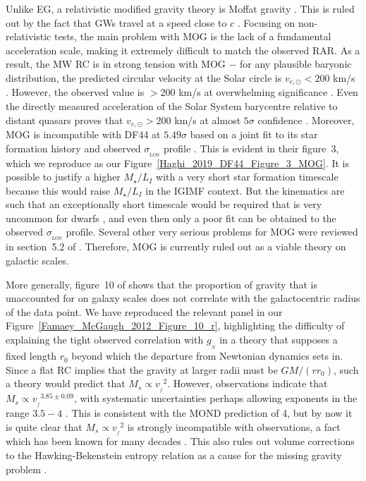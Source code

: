 \documentclass[fleqn,usenatbib,useAMS]{mnras} %
\begin{document}
Unlike EG, a relativistic modified gravity theory is Moffat gravity \citep[MOG;][]{Moffat_2006}. This is ruled out by the fact that GWs travel at a speed close to $c$ \citep{Boran_2018}. Focusing on non-relativistic tests, the main problem with MOG is the lack of a fundamental acceleration scale, making it extremely difficult to match the observed RAR. As a result, the MW RC is in strong tension with MOG $-$ for any plausible baryonic distribution, the predicted circular velocity at the Solar circle is $v_{c, \odot} < 200$ km/s \citep{Negrelli_2018}. However, the observed value is $> 200$ km/s at overwhelming significance \citep[e.g.][]{McMillan_2017, McGaugh_2018}. Even the directly measured acceleration of the Solar System barycentre relative to distant quasars proves that $v_{c, \odot} > 200$ km/s at almost $5\sigma$ confidence \citep{Bovy_2020, Klioner_2021}. Moreover, MOG is incompatible with DF44 at $5.49 \sigma$ based on a joint fit to its star formation history and observed $\sigma_{_\text{LOS}}$ profile \citep{Haghi_2019_DF44}. This is evident in their figure~3, which we reproduce as our Figure~\ref{Haghi_2019_DF44_Figure_3_MOG}. It is possible to justify a higher $M_{\star}/L_I$ with a very short star formation timescale because this would raise $M_{\star}/L_I$ in the IGIMF context. But the kinematics are such that an exceptionally short timescale would be required that is very uncommon for dwarfs \citep{Jan_2009}, and even then only a poor fit can be obtained to the observed $\sigma_{_\text{LOS}}$ profile. Several other very serious problems for MOG were reviewed in section~5.2 of \citet{Martino_2020}. Therefore, MOG is currently ruled out as a viable theory on galactic scales.

More generally, figure~10 of \citet{Famaey_McGaugh_2012} shows that the proportion of gravity that is unaccounted for on galaxy scales does not correlate with the galactocentric radius of the data point. We have reproduced the relevant panel in our Figure~\ref{Famaey_McGaugh_2012_Figure_10_r}, highlighting the difficulty of explaining the tight observed correlation with $g_{_N}$ in a theory that supposes a fixed length $r_0$ beyond which the departure from Newtonian dynamics sets in. Since a flat RC implies that the gravity at larger radii must be $GM/\left(rr_0\right)$, such a theory would predict that $M_s \propto {v_{_f}}^2$. However, observations indicate that $M_s \propto {v_{_f}}^{3.85 \pm 0.09}$, with systematic uncertainties perhaps allowing exponents in the range $3.5-4$ \citep{Lelli_2019}. This is consistent with the MOND prediction of 4, but by now it is quite clear that $M_s \propto {v_{_f}}^2$ is strongly incompatible with observations, a fact which has been known for many decades \citep{McGaugh_2000}. This also rules out volume corrections to the Hawking-Bekenstein entropy relation as a cause for the missing gravity problem \citep{Perez_Cuellar_2021}.
\end{document}
